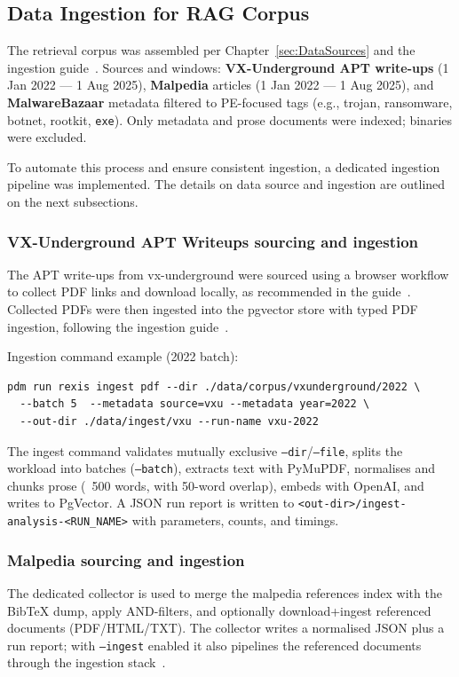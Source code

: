 \subsection{Data Ingestion for RAG Corpus}\label{subsec:RAGIngestionExec}
The retrieval corpus was assembled per Chapter~\ref{sec:DataSources} and the ingestion
guide~\cite{rexisIngestionPipeline}. Sources and windows: \textbf{VX-Underground APT write-ups} (1
Jan 2022 --- 1 Aug 2025), \textbf{Malpedia} articles (1 Jan 2022 --- 1 Aug 2025), and
\textbf{MalwareBazaar} metadata filtered to PE-focused tags (e.g., trojan, ransomware,
botnet, rootkit, \texttt{exe}). Only metadata and prose documents were indexed; binaries were
excluded.

To automate this process and ensure consistent ingestion, a dedicated ingestion pipeline was
implemented. The details on data source and ingestion are outlined on the next subsections.

\subsubsection{VX-Underground APT Writeups sourcing and ingestion}\label{subsubsec:VXUIngestionExec}
The APT write-ups from \gls{vx-underground} were sourced using a browser workflow to collect PDF
links and download locally, as recommended in the guide~\cite{rexisDataSourcingVXU}. Collected PDFs
were then ingested into the \gls{pgvector} store with typed PDF ingestion, following the ingestion
guide~\cite{rexisIngestVXU}.

Ingestion command example (2022 batch):
\begin{verbatim}
pdm run rexis ingest pdf --dir ./data/corpus/vxunderground/2022 \
  --batch 5  --metadata source=vxu --metadata year=2022 \
  --out-dir ./data/ingest/vxu --run-name vxu-2022
\end{verbatim}

The ingest command validates mutually exclusive \texttt{--dir}/\texttt{--file}, splits the workload
into batches (\texttt{--batch}), extracts text with PyMuPDF, normalises and chunks prose (~500
words, with 50-word overlap), embeds with OpenAI, and writes to PgVector. A JSON run report is
written to \texttt{<out-dir>/ingest-analysis-\textless RUN\_NAME\textgreater{}} with parameters,
counts, and timings.

\subsubsection{Malpedia sourcing and ingestion}\label{subsubsec:MalpediaIngestionExec}
The dedicated collector is used to merge the \gls{malpedia} references index with the BibTeX dump,
apply AND-filters, and optionally download+ingest referenced documents (PDF/HTML/TXT). The
collector writes a normalised JSON plus a run report; with \texttt{--ingest} enabled it also
pipelines the referenced documents through the ingestion stack~\cite{rexisDataSourcingMalpedia}.

